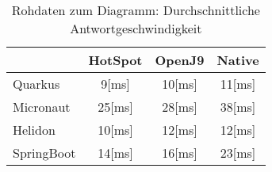 \begin{table}[h]
    \centering
    \begin{tabular}{l|ccc}
        \hline
        & HotSpot & OpenJ9 & Native \\
        \hline
        Quarkus & 9[ms] & 10[ms] & 11[ms] \\
        Micronaut & 25[ms] & 28[ms] & 38[ms] \\
        Helidon & 10[ms] & 12[ms] & 12[ms] \\
        SpringBoot & 14[ms] & 16[ms] & 23[ms] \\
        \hline
    \end{tabular}
    \caption{Rohdaten zum Diagramm: Durchschnittliche Antwortgeschwindigkeit}
\end{table}
